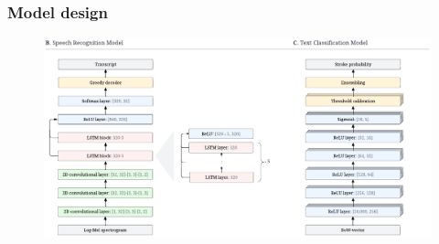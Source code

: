 \begin{frame}
    \frametitle{Model design}
    \begin{figure}
        \centering
        \includegraphics[width=0.70\paperwidth]{../graphics/paper_retrospective/model_sketch-bottom-part.pdf}
    \end{figure}
\end{frame}


